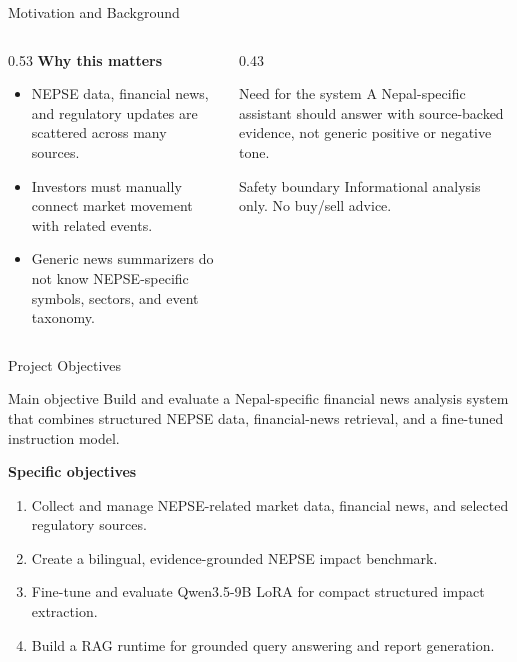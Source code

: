\documentclass[aspectratio=169,11pt]{beamer}
\begin{document}
\begin{frame}{Motivation and Background}
  \begin{columns}[T,onlytextwidth]
    \begin{column}{0.53\textwidth}
      \textbf{Why this matters}
      \begin{itemize}
        \item NEPSE data, financial news, and regulatory updates are scattered across many sources.
        \item Investors must manually connect market movement with related events.
        \item Generic news summarizers do not know NEPSE-specific symbols, sectors, and event taxonomy.
      \end{itemize}
    \end{column}
    \begin{column}{0.43\textwidth}
      \begin{block}{Need for the system}
        A Nepal-specific assistant should answer with source-backed evidence, not generic positive or negative tone.
      \end{block}
      \begin{alertblock}{Safety boundary}
        Informational analysis only. No buy/sell advice.
      \end{alertblock}
    \end{column}
  \end{columns}
\end{frame}

\begin{frame}{Project Objectives}
  \begin{block}{Main objective}
    Build and evaluate a Nepal-specific financial news analysis system that combines structured NEPSE data, financial-news retrieval, and a fine-tuned instruction model.
  \end{block}

  \textbf{Specific objectives}
  \begin{enumerate}
    \item Collect and manage NEPSE-related market data, financial news, and selected regulatory sources.
    \item Create a bilingual, evidence-grounded NEPSE impact benchmark.
    \item Fine-tune and evaluate Qwen3.5-9B LoRA for compact structured impact extraction.
    \item Build a RAG runtime for grounded query answering and report generation.
  \end{enumerate}
\end{frame}
\end{document}
